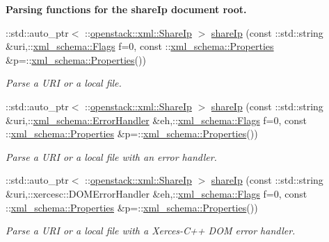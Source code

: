 \begin{Indent}{\bf Parsing functions for the shareIp document root.}\par
\begin{DoxyCompactItemize}
\item 
::std::auto\_\-ptr$<$ ::\hyperlink{classopenstack_1_1xml_1_1ShareIp}{openstack::xml::ShareIp} $>$ \hyperlink{namespaceopenstack_1_1xml_a84e0679c0e7a452ac854f2847393b1cc}{shareIp} (const ::std::string \&uri,::\hyperlink{namespacexml__schema_affb4c227cbd9aa7453dd1dc5a1401943}{xml\_\-schema::Flags} f=0, const ::\hyperlink{namespacexml__schema_ad27ce19a7ee1d3b1064092648898f64c}{xml\_\-schema::Properties} \&p=::\hyperlink{namespacexml__schema_ad27ce19a7ee1d3b1064092648898f64c}{xml\_\-schema::Properties}())
\begin{DoxyCompactList}\small\item\em Parse a URI or a local file. \item\end{DoxyCompactList}\item 
::std::auto\_\-ptr$<$ ::\hyperlink{classopenstack_1_1xml_1_1ShareIp}{openstack::xml::ShareIp} $>$ \hyperlink{namespaceopenstack_1_1xml_a0e5c111a794bf514599538774ad343b7}{shareIp} (const ::std::string \&uri,::\hyperlink{namespacexml__schema_ab1c9361bfd3b404eaabf0c31eded79dc}{xml\_\-schema::ErrorHandler} \&eh,::\hyperlink{namespacexml__schema_affb4c227cbd9aa7453dd1dc5a1401943}{xml\_\-schema::Flags} f=0, const ::\hyperlink{namespacexml__schema_ad27ce19a7ee1d3b1064092648898f64c}{xml\_\-schema::Properties} \&p=::\hyperlink{namespacexml__schema_ad27ce19a7ee1d3b1064092648898f64c}{xml\_\-schema::Properties}())
\begin{DoxyCompactList}\small\item\em Parse a URI or a local file with an error handler. \item\end{DoxyCompactList}\item 
::std::auto\_\-ptr$<$ ::\hyperlink{classopenstack_1_1xml_1_1ShareIp}{openstack::xml::ShareIp} $>$ \hyperlink{namespaceopenstack_1_1xml_aedc4e9f806f9b8d7386242ed811b7b56}{shareIp} (const ::std::string \&uri,::xercesc::DOMErrorHandler \&eh,::\hyperlink{namespacexml__schema_affb4c227cbd9aa7453dd1dc5a1401943}{xml\_\-schema::Flags} f=0, const ::\hyperlink{namespacexml__schema_ad27ce19a7ee1d3b1064092648898f64c}{xml\_\-schema::Properties} \&p=::\hyperlink{namespacexml__schema_ad27ce19a7ee1d3b1064092648898f64c}{xml\_\-schema::Properties}())
\begin{DoxyCompactList}\small\item\em Parse a URI or a local file with a Xerces-\/C++ DOM error handler. \item\end{DoxyCompactList}\item 

\end{DoxyCompactItemize}
\end{Indent}

